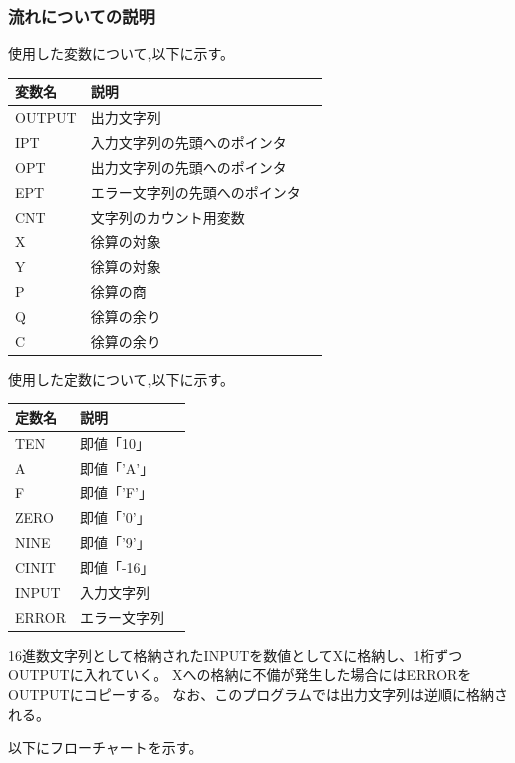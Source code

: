 \documentclass[dvipdfmx,12pt]{jreport}
\begin{document}
\subsubsection*{流れについての説明}
使用した変数について,以下に示す。
\begin{table}[h]
  \begin{tabular}{|l|l|l|} \hline
    変数名 & 説明 \\ \hline
    OUTPUT & 出力文字列 \\ \hline
    IPT & 入力文字列の先頭へのポインタ \\ \hline
    OPT & 出力文字列の先頭へのポインタ \\ \hline
    EPT & エラー文字列の先頭へのポインタ \\ \hline
    CNT & 文字列のカウント用変数 \\ \hline
    X & 徐算の対象 \\ \hline
    Y & 徐算の対象 \\ \hline
    P & 徐算の商 \\ \hline
    Q & 徐算の余り \\ \hline
    C & 徐算の余り \\ \hline
  \end{tabular}
\end{table}
使用した定数について,以下に示す。
\begin{table}[h]
  \begin{tabular}{|l|l|l|} \hline
    定数名 & 説明 \\ \hline
    TEN & 即値「10」 \\ \hline
    A & 即値「'A'」 \\ \hline
    F & 即値「'F'」 \\ \hline
    ZERO & 即値「'0'」 \\ \hline
    NINE & 即値「'9'」 \\ \hline
    CINIT & 即値「-16」 \\ \hline
    INPUT & 入力文字列 \\ \hline
    ERROR & エラー文字列 \\ \hline
  \end{tabular}
\end{table}

16進数文字列として格納されたINPUTを数値としてXに格納し、1桁ずつOUTPUTに入れていく。
Xへの格納に不備が発生した場合にはERRORをOUTPUTにコピーする。
なお、このプログラムでは出力文字列は逆順に格納される。

以下にフローチャートを示す。 \\
\end{document}

